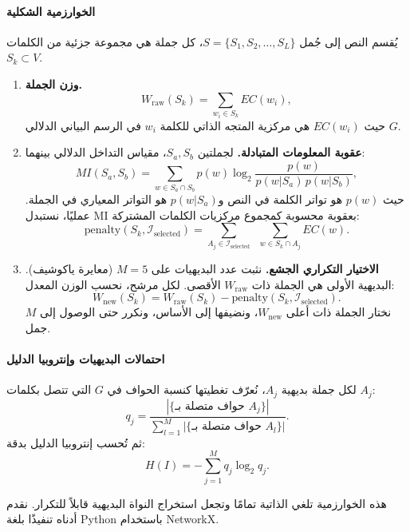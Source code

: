 \documentclass[11pt,a4paper]{article}
\begin{document}
	\paragraph{الخوارزمية الشكلية}
	يُقسم النص إلى جُمل \(S = \{S_1, S_2, \dots, S_L\}\)، كل جملة هي مجموعة جزئية من الكلمات \(S_k \subset V\).
	
	\begin{enumerate}
		\item \textbf{وزن الجملة.}
		\[
		W_{\text{raw}}(S_k) = \sum_{w_i \in S_k} EC(w_i),
		\]
		حيث \(EC(w_i)\) هي مركزية المتجه الذاتي للكلمة \(w_i\) في الرسم البياني الدلالي \(G\).
		
		\item \textbf{عقوبة المعلومات المتبادلة.}
		لجملتين \(S_a, S_b\)، مقياس التداخل الدلالي بينهما:
		\[
		MI(S_a, S_b) = \sum_{w \in S_a \cap S_b} p(w) \log_2 \frac{p(w)}{p(w|S_a)\, p(w|S_b)},
		\]
		حيث \(p(w)\) هو تواتر الكلمة في النص و\(p(w|S_a)\) هو التواتر المعياري في الجملة. عمليًا، نستبدل MI بعقوبة محسوبة كمجموع مركزيات الكلمات المشتركة:
		\[
		\text{penalty}(S_k, \mathcal{I}_{\text{selected}}) = \sum_{A_j \in \mathcal{I}_{\text{selected}}} \;\; \sum_{w \in S_k \cap A_j} EC(w).
		\]
		
		\item \textbf{الاختيار التكراري الجشع.}
		نثبت عدد البديهيات على \(M = 5\) (معايرة ياكوشيف). البديهية الأولى هي الجملة ذات \(W_{\text{raw}}\) الأقصى. لكل مرشح، نحسب الوزن المعدل:
		\[
		W_{\text{new}}(S_k) = W_{\text{raw}}(S_k) - \text{penalty}(S_k, \mathcal{I}_{\text{selected}}).
		\]
		نختار الجملة ذات أعلى \(W_{\text{new}}\)، ونضيفها إلى الأساس، ونكرر حتى الوصول إلى \(M\) جمل.
	\end{enumerate}
	
	\paragraph{احتمالات البديهيات وإنتروبيا الدليل}
	لكل جملة بديهية \(A_j\)، نُعرّف تغطيتها كنسبة الحواف في \(G\) التي تتصل بكلمات \(A_j\):
	\[
	q_j = \frac{|\{\text{حواف متصلة بـ } A_j\}|}{\sum_{l=1}^M |\{\text{حواف متصلة بـ } A_l\}|}.
	\]
	ثم تُحسب إنتروبيا الدليل بدقة:
	\[
	H(I) = -\sum_{j=1}^{M} q_j \log_2 q_j.
	\]
	
	هذه الخوارزمية تلغي الذاتية تمامًا وتجعل استخراج النواة البديهية قابلاً للتكرار. نقدم أدناه تنفيذًا بلغة Python باستخدام NetworkX.
	
\end{document}
